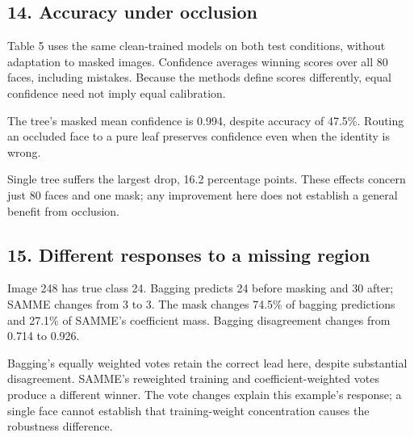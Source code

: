 \documentclass[10pt,twocolumn,letterpaper]{article}
\begin{document}
\subsection*{14. Accuracy under occlusion}
Table 5 uses the same clean-trained models on both test conditions, without adaptation to masked images. Confidence averages winning scores over all 80 faces, including mistakes. Because the methods define scores differently, equal confidence need not imply equal calibration.

The tree's masked mean confidence is 0.994, despite accuracy of 47.5\%. Routing an occluded face to a pure leaf preserves confidence even when the identity is wrong.

Single tree suffers the largest drop, 16.2 percentage points.  These effects concern just 80 faces and one mask; any improvement here does not establish a general benefit from occlusion.

\newpage
\subsection*{15. Different responses to a missing region}
Image 248 has true class 24. Bagging predicts 24 before masking and 30 after; SAMME changes from 3 to 3. The mask changes 74.5\% of bagging predictions and 27.1\% of SAMME's coefficient mass. Bagging disagreement changes from 0.714 to 0.926.

Bagging's equally weighted votes retain the correct lead here, despite substantial disagreement. SAMME's reweighted training and coefficient-weighted votes produce a different winner. The vote changes explain this example's response; a single face cannot establish that training-weight concentration causes the robustness difference.
\end{document}
